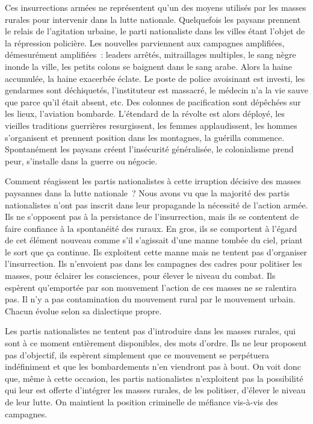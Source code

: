 \documentclass[french,twoside]{book} %
\begin{document}
\bigbreak
\noindent Ces insurrections armées ne représentent qu’un des moyens utilisés par les masses rurales pour intervenir dans la lutte nationale. Quelquefois les paysans prennent le relais de l’agitation urbaine, le parti nationaliste dans les villes étant l’objet de la répression policière. Les nouvelles parviennent aux campagnes amplifiées, démesurément amplifiées : leaders arrêtés, mitraillages multiples, le sang nègre inonde la ville, les petits colons se baignent dans le sang arabe. Alors la haine accumulée, la haine exacerbée éclate. Le poste de police avoisinant est investi, les gendarmes sont déchiquetés, l’instituteur est massacré, le médecin n’a la vie sauve que parce qu’il était absent, etc. Des colonnes de pacification sont dépêchées sur les lieux, l’aviation bombarde. L’étendard de la révolte est alors déployé, les vieilles traditions guerrières resurgissent, les femmes applaudissent, les hommes s’organisent et prennent position dans les montagnes, la guérilla commence. Spontanément les paysans créent l’insécurité généralisée, le colonialisme prend peur, s’installe dans la guerre ou négocie.\par
\bigbreak
\noindent Comment réagissent les partis nationalistes à cette irruption décisive des masses paysannes dans la lutte nationale ? Nous avons vu que la majorité des partis nationalistes n’ont pas inscrit dans leur propagande la nécessité de l’action armée. Ils ne s’opposent pas à la persistance de l’insurrection, mais ils se contentent de faire confiance à la spontanéité des ruraux. En   gros, ils se comportent à l’égard de cet élément nouveau comme s’il s’agissait d’une manne tombée du ciel, priant le sort que ça continue. Ils exploitent cette manne mais ne tentent pas d’organiser l’insurrection. Ils n’envoient pas dans les campagnes des cadres pour politiser les masses, pour éclairer les consciences, pour élever le niveau du combat. Ils espèrent qu’emportée par son mouvement l’action de ces masses ne se ralentira pas. Il n’y a pas contamination du mouvement rural par le mouvement urbain. Chacun évolue selon sa dialectique propre.\par
Les partis nationalistes ne tentent pas d’introduire dans les masses rurales, qui sont à ce moment entièrement disponibles, des mots d’ordre. Ils ne leur proposent pas d’objectif, ils espèrent simplement que ce mouvement se perpétuera indéfiniment et que les bombardements n’en viendront pas à bout. On voit donc que, même à cette occasion, les partis nationalistes n’exploitent pas la possibilité qui leur est offerte d’intégrer les masses rurales, de les politiser, d’élever le niveau de leur lutte. On maintient la position criminelle de méfiance vis-à-vis des campagnes.\par
\end{document}
